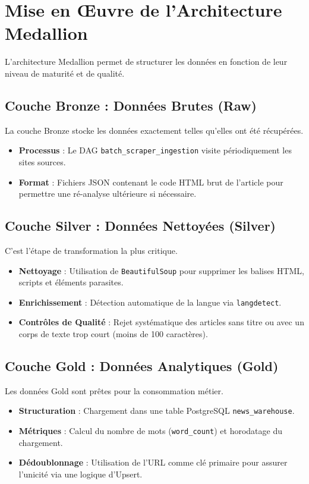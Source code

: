 \documentclass[12pt,a4paper]{article}
\begin{document}
\section{Mise en Œuvre de l'Architecture Medallion}
L'architecture Medallion permet de structurer les données en fonction de leur niveau de maturité et de qualité.

\subsection{Couche Bronze : Données Brutes (Raw)}
La couche Bronze stocke les données exactement telles qu'elles ont été récupérées.
\begin{itemize}
    \item \textbf{Processus} : Le DAG \texttt{batch\_scraper\_ingestion} visite périodiquement les sites sources.
    \item \textbf{Format} : Fichiers JSON contenant le code HTML brut de l'article pour permettre une ré-analyse ultérieure si nécessaire.
\end{itemize}

\subsection{Couche Silver : Données Nettoyées (Silver)}
C'est l'étape de transformation la plus critique. 
\begin{itemize}
    \item \textbf{Nettoyage} : Utilisation de \texttt{BeautifulSoup} pour supprimer les balises HTML, scripts et éléments parasites.
    \item \textbf{Enrichissement} : Détection automatique de la langue via \texttt{langdetect}.
    \item \textbf{Contrôles de Qualité} : Rejet systématique des articles sans titre ou avec un corps de texte trop court (moins de 100 caractères).
\end{itemize}

\subsection{Couche Gold : Données Analytiques (Gold)}
Les données Gold sont prêtes pour la consommation métier.
\begin{itemize}
    \item \textbf{Structuration} : Chargement dans une table PostgreSQL \texttt{news\_warehouse}.
    \item \textbf{Métriques} : Calcul du nombre de mots (\texttt{word\_count}) et horodatage du chargement.
    \item \textbf{Dédoublonnage} : Utilisation de l'URL comme clé primaire pour assurer l'unicité via une logique d'Upsert.
\end{itemize}
\end{document}
